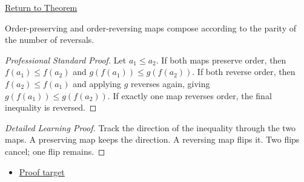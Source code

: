 \newpage
{}
\label{prf:monotone-composition-rules}

\begin{remark*}[Return]
\hyperref[thm:monotone-composition-rules]{Return to Theorem}
\end{remark*}

\begin{theorem*}
Order-preserving and order-reversing maps compose according to the parity of
the number of reversals.
\end{theorem*}

\begin{proof}[Professional Standard Proof]
\LRAProofBodyStart
Let $a_1\leq a_2$. If both maps preserve order, then
$f(a_1)\leq f(a_2)$ and $g(f(a_1))\leq g(f(a_2))$. If both reverse order,
then $f(a_2)\leq f(a_1)$ and applying $g$ reverses again, giving
$g(f(a_1))\leq g(f(a_2))$. If exactly one map reverses order, the final
inequality is reversed.
\end{proof}

\begin{proof}[Detailed Learning Proof]
\LRAProofBodyStart
Track the direction of the inequality through the two maps. A preserving map
keeps the direction. A reversing map flips it. Two flips cancel; one flip
remains.
\end{proof}
\begin{remark*}
\end{remark*}



\begin{dependencies}
\begin{itemize}
  \item \hyperref[thm:monotone-composition-rules]{Proof target}
\end{itemize}
\end{dependencies}

\clearpage

